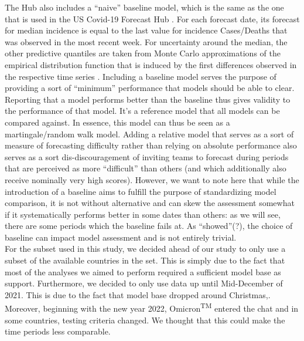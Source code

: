 The Hub also includes a ``naive'' baseline model, which is the same as the one that is used in the US Covid-19 Forecast Hub . For each forecast date, its forecast for median incidence is equal to the last value for incidence Cases/Deaths that was observed in the most recent week. For uncertainty around the median, the other predictive quantiles are taken from Monte Carlo approximations of the empirical distribution function that is induced by the first differences observed in the respective time series \citep{cramer_evaluation_2022}. Including a baseline model serves the purpose of providing a sort of ``minimum'' performance that models should be able to clear. Reporting that a model performs better than the baseline thus gives validity to the performance of that model. It's a reference model that all models can be compared against. In essence, this model can thus be seen as a martingale/random walk model. Adding a relative model that serves as a sort of measure of forecasting difficulty rather than relying on absolute performance also serves as a sort dis-discouragement of inviting teams to forecast during periods that are perceived as more ``difficult'' than others (and which additionally also receive nominally very high scores). However, we want to note here that while the introduction of a baseline aims to fulfill the purpose of standardizing model comparison, it is not without alternative and can skew the assessment somewhat if it systematically performs better in some dates than others: as we will see, there are some periods which the baseline fails at. As \cite{bracher_evaluating_2021} ``showed''(?), the choice of baseline can impact model assessment and is not entirely trivial.\\
For the subset used in this study, we decided ahead of our study to only use a subset of the available countries in the set. This is simply due to the fact that most of the analyses we aimed to perform required a sufficient model base as support. Furthermore, we decided to only use data up until Mid-December of 2021. This is due to the fact that model base dropped around Christmas,. Moreover, beginning with the new year 2022, Omicron\textsuperscript{TM} entered the chat and in some countries, testing criteria changed. We thought that this could make the time periods less comparable.\\
